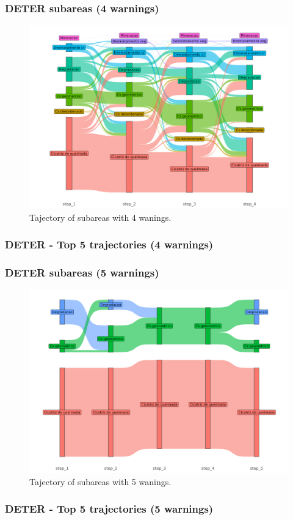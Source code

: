 \documentclass[aspectratio=169]{beamer}
\begin{document}
\begin{frame}
    \frametitle{DETER subareas (4 warnings)}
    \begin{figure}[h] 
        \includegraphics[width=0.65\linewidth]
        {./figures/plot_deter_subarea_trajectory_4.png}
        \caption{Tajectory of subareas with 4 wanings.}
        \label{fig:deter_subarea_trajectory_4}
    \end{figure}
\end{frame}

\begin{frame}[allowframebreaks]
    \frametitle{DETER - Top 5 trajectories (4 warnings)}
    
\end{frame}

\begin{frame}
    \frametitle{DETER subareas (5 warnings)}
    \begin{figure}[h] 
        \includegraphics[width=0.65\linewidth]
        {./figures/plot_deter_subarea_trajectory_5.png}
        \caption{Tajectory of subareas with 5 wanings.}
        \label{fig:deter_subarea_trajectory_5}
    \end{figure}
\end{frame}

\begin{frame}[allowframebreaks]
    \frametitle{DETER - Top 5 trajectories (5 warnings)}
    
\end{frame}
\end{document}
